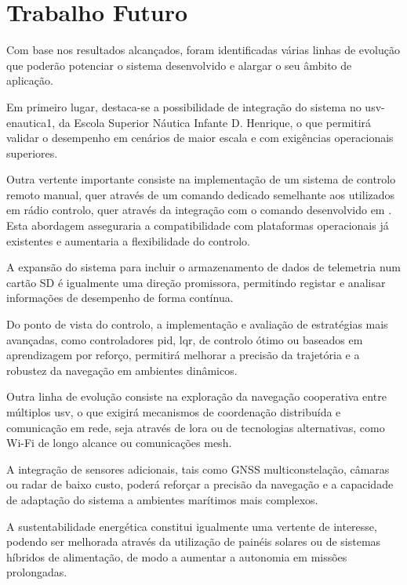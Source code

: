 \section{Trabalho Futuro}
\label{sec:trabalho-futuro}

Com base nos resultados alcançados, foram identificadas várias linhas de evolução que poderão potenciar o sistema desenvolvido e alargar o seu âmbito de aplicação.  

Em primeiro lugar, destaca-se a possibilidade de integração do sistema no \gls{usv}-enautica1, da Escola Superior Náutica Infante D. Henrique, o que permitirá validar o desempenho em cenários de maior escala e com exigências operacionais superiores.  

Outra vertente importante consiste na implementação de um sistema de controlo remoto manual, quer através de um comando dedicado semelhante aos utilizados em rádio controlo, quer através da integração com o comando desenvolvido em \cite{catamara-telecomandado}. Esta abordagem asseguraria a compatibilidade com plataformas operacionais já existentes e aumentaria a flexibilidade do controlo.  

A expansão do sistema para incluir o armazenamento de dados de telemetria num cartão SD é igualmente uma direção promissora, permitindo registar e analisar informações de desempenho de forma contínua.  

Do ponto de vista do controlo, a implementação e avaliação de estratégias mais avançadas, como controladores \gls{pid}, \gls{lqr}, de controlo ótimo ou baseados em aprendizagem por reforço, permitirá melhorar a precisão da trajetória e a robustez da navegação em ambientes dinâmicos.  

Outra linha de evolução consiste na exploração da navegação cooperativa entre múltiplos \gls{usv}, o que exigirá mecanismos de coordenação distribuída e comunicação em rede, seja através de \gls{lora} ou de tecnologias alternativas, como Wi-Fi de longo alcance ou comunicações mesh.  

A integração de sensores adicionais, tais como GNSS multiconstelação, câmaras ou radar de baixo custo, poderá reforçar a precisão da navegação e a capacidade de adaptação do sistema a ambientes marítimos mais complexos.  

A sustentabilidade energética constitui igualmente uma vertente de interesse, podendo ser melhorada através da utilização de painéis solares ou de sistemas híbridos de alimentação, de modo a aumentar a autonomia em missões prolongadas.  

